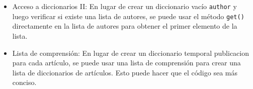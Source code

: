 \begin{itemize}
    \item Acceso a diccionarios II:
    En lugar de crear un diccionario vacío \texttt{author} y luego verificar si existe una lista de autores, se puede usar el método \verb|get()| directamente en la lista de autores para obtener el primer elemento de la lista.

    \item Lista de comprensión:
    En lugar de crear un diccionario temporal publicacion para cada artículo, se puede usar una lista de comprensión para crear una lista de diccionarios de artículos. Esto puede hacer que el código sea más conciso.
	
    
\end{itemize}
